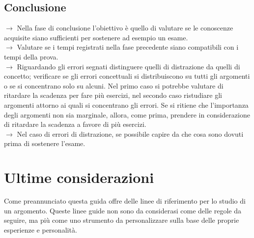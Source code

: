 \documentclass[11pt,a4paper]{article}
\begin{document}
\subsection{Conclusione}
$\rightarrow$ Nella fase di conclusione l'obiettivo è quello di valutare se le conoscenze acquisite siano sufficienti per sostenere ad esempio un esame. \\
$\rightarrow$ Valutare se i tempi registrati nella fase precedente siano compatibili con i tempi della prova.\\
$\rightarrow$ Riguardando gli errori segnati distinguere quelli di distrazione da quelli di concetto; verificare se gli errori concettuali si distribuiscono su tutti gli argomenti o se si concentrano solo su alcuni.  Nel primo caso si potrebbe valutare di ritardare la scadenza per fare più esercizi, nel secondo caso ristudiare gli argomenti attorno ai quali si concentrano gli errori. Se si ritiene che l'importanza degli argomenti non sia marginale, allora, come prima, prendere in considerazione di ritardare la scadenza a favore di più esercizi.\\
$\rightarrow$ Nel caso di errori di distrazione, se possibile capire da che cosa sono dovuti prima di sostenere l'esame.\\

\section{Ultime considerazioni}
Come preannunciato questa guida offre delle linee di riferimento per lo studio di un argomento. Queste linee guide non sono da considerasi come delle regole da seguire, ma più come uno strumento da personalizzare sulla base delle proprie esperienze e personalità. \\
	
\end{document}
